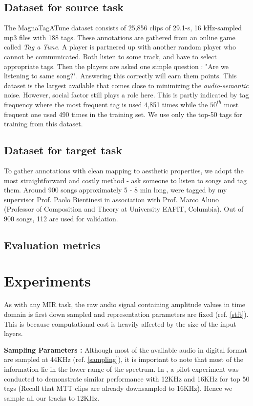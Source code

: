 \subsection{Dataset for source task}
\label{source}
The MagnaTagATune dataset consists of 25,856 clips of 29.1-s, 16 kHz-sampled mp3 files with 188 tags. These annotations are gathered from an online game called \textit{Tag a Tune}. A player is partnered up with another random player who cannot be communicated. Both listen to some track, and have to select appropriate tags. Then the players are asked one simple question : "Are we listening to same song?". Answering this correctly will earn them points. This dataset is the largest available that comes close to minimizing the \textit{audio-semantic} noise. However, social factor still plays a role here. This is partly indicated by tag frequency where the most frequent tag is used 4,851 times while the $50^{th}$ most frequent one used 490 times in the training set. We use only the top-50 tags for training from this dataset.  

\subsection{Dataset for target task}
\label{target}
To gather annotations with clean mapping to aesthetic properties, we adopt the most straightforward and costly method - ask someone to listen to songs and tag them. Around 900 songs approximately 5 - 8 min long, were tagged by my supervisor Prof. Paolo Bientinesi in association with Prof. Marco Aluno (Professor of Composition and Theory at University EAFIT, Columbia). Out of 900 songs, 112 are used for validation.  

\subsection{Evaluation metrics}
\label{evaluation}

\section{Experiments}
\label{experiments}
As with any MIR task, the raw audio signal containing amplitude values in time domain is first down sampled and representation parameters are fixed (ref. \ref{stft}). This is because computational cost is heavily affected by the size of the input layers.
\bigskip
 
\noindent \textbf{Sampling Parameters : } Although most of the available audio in digital format are sampled at 44KHz (ref. \ref{sampling}), it is important to note that most of the information lie in the lower range of the spectrum. In \cite{choi_cnn}, a pilot experiment was conducted to demonstrate similar performance with 12KHz and 16KHz for top 50 tags (Recall that MTT clips are already downsampled to 16KHz). Hence we sample all our tracks to 12KHz. 
\bigskip

